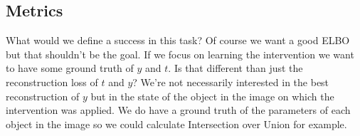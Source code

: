 \documentclass{article}
\begin{document}





\subsection{Metrics}
What would we define a success in this task? Of course we want a good ELBO but that shouldn't be the goal. If we focus on learning the intervention we want to have some ground truth of $y$ and $t$. Is that different than just the reconstruction loss of $t$ and $y$? We're not necessarily interested in the best reconstruction of $y$ but in the state of the object in the image on which the intervention was applied. We do have a ground truth of the parameters of each object in the image so we could calculate Intersection over Union for example.
\newpage
\end{document}
